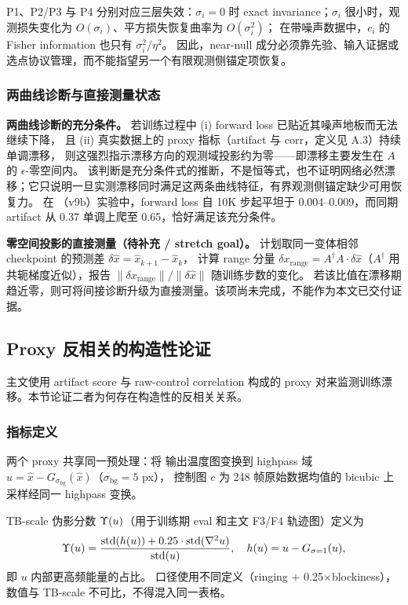 P1、P2/P3 与 P4 分别对应三层失效：\(\sigma_i=0\) 时 exact invariance；\(\sigma_i\) 很小时，观测损失变化为 \(O(\sigma_i)\)、平方损失恢复曲率为 \(O(\sigma_i^2)\)；
在带噪声数据中，\(c_i\) 的 Fisher information 也只有 \(\sigma_i^2/\eta^2\)。
因此，near-null 成分必须靠先验、输入证据或选点协议管理，而不能指望另一个有限观测侧锚定项恢复。

\subsubsection{两曲线诊断与直接测量状态}

\textbf{两曲线诊断的充分条件。} 若训练过程中 (i) forward loss 已贴近其噪声地板而无法继续下降，
且 (ii) 真实数据上的 proxy 指标（artifact 与 corr，定义见 A.3）持续单调漂移，
则这强烈指示漂移方向的观测域投影约为零——即漂移主要发生在 \(A\) 的 \(\epsilon\)-零空间内。
该判断是充分条件式的推断，不是恒等式，也不证明网络必然漂移；它只说明一旦实测漂移同时满足这两条曲线特征，有界观测侧锚定缺少可用恢复力。
在 （v9b）实验中，forward loss 自 10K 步起平坦于 0.004--0.009，而同期 artifact 从 0.37 单调上爬至 0.65，恰好满足该充分条件。

\textbf{零空间投影的直接测量（待补充 / stretch goal）。} 计划取同一变体相邻 checkpoint 的预测差 \(\delta\hat{x} = \hat{x}_{k+1} - \hat{x}_k\)，
计算 range 分量 \(\delta x_{\mathrm{range}} = A^\dagger A \cdot \delta\hat{x}\)（\(A^\dagger\) 用共轭梯度近似），报告 \(\|\delta x_{\mathrm{range}}\| / \|\delta\hat{x}\|\) 随训练步数的变化。
若该比值在漂移期趋近零，则可将间接诊断升级为直接测量。该项尚未完成，不能作为本文已交付证据。

\subsection{Proxy 反相关的构造性论证}

主文使用 artifact score 与 raw-control correlation 构成的 proxy 对来监测训练漂移。本节论证二者为何存在构造性的反相关关系。

\subsubsection{指标定义}

两个 proxy 共享同一预处理：将  输出温度图变换到 highpass 域 \(u = \hat{x} - G_{\sigma_{\mathrm{bg}}}(\hat{x})\)（\(\sigma_{\mathrm{bg}} = 5\)  px），
控制图 \(c\) 为 248 帧原始数据均值的 bicubic 上采样经同一 highpass 变换。

TB-scale 伪影分数 \(\Upsilon(u)\)（用于训练期 eval 和主文 F3/F4 轨迹图）定义为
\[
  \Upsilon(u) = \frac{\mathrm{std}(h(u)) + 0.25 \cdot \mathrm{std}(\nabla^2 u)}{\mathrm{std}(u)},\quad h(u)=u-G_{\sigma=1}(u),
\]
即 \(u\) 内部更高频能量的占比。 口径使用不同定义（ringing \(+\) 0.25\(\times\)blockiness），数值与 TB-scale 不可比，不得混入同一表格。

